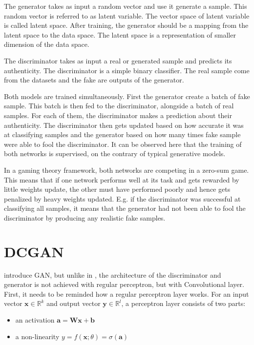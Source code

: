 \documentclass[11pt,a4paper,twoside]{report}
\begin{document}
The generator takes as input a random vector and use it generate a sample. This random vector is referred to as latent variable. The vector space of latent variable is called latent space. After training, the generator should be a mapping from the latent space to the data space. The latent space is  a representation of smaller dimension of the data space.

The discriminator takes as input a real or generated sample and predicts its authenticity. The discriminator is a simple binary classifier. The real sample come from the datasets and the fake are outputs of the generator.

Both models are trained simultaneously. First the generator create a batch of fake sample. This batch is then fed to the discriminator, alongside a batch of real samples. For each of them, the discriminator makes a prediction about their authenticity. The discriminator then gets updated based on how accurate it was at classifying samples and the generator based on how many times fake sample were able to fool the discriminator. It can be observed here that the training of both networks is supervised, on the contrary of typical generative models.

In a gaming theory framework, both networks are competing in a zero-sum game. This means that if one network performs well at its task and gets rewarded by little weights update, the other must have performed poorly and hence gets penalized by heavy weights updated. E.g. if the discriminator was successful at classifying all samples, it means that the generator had not been able to fool the discriminator by producing any realistic fake samples.  


\section{DCGAN}

\cite{radford2015unsupervised} introduce GAN, but unlike in \cite{goodfellow2020generative}, the architecture of the discriminator and generator is not achieved with regular perceptron, but with Convolutional layer. First, it needs to be reminded how a regular perceptron layer works. For an input vector $\mathbf{x} \in \mathbb{R}^k$ and output vector $\mathbf{y} \in \mathbb{R}^l$, a perceptron layer consists of two parts:

\begin{itemize}
    \item an activation $\mathbf{a} = \mathbf{W} \mathbf{x} + \mathbf{b}$
    \item a non-linearity $y = f(\mathbf{x};\theta) = \sigma(\mathbf{a})$
\end{itemize}
\end{document}
